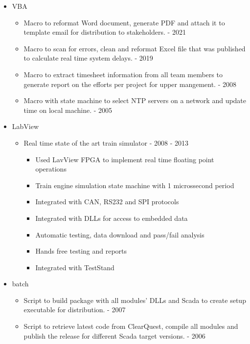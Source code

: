 {\begin{itemize}
    \item VBA
    \begin{itemize}
        \item Macro to reformat Word document, generate PDF and attach it to template email for distribution to stakeholders. - 2021
        \item Macro to scan for errors, clean and reformat Excel file that was published to calculate real time system delays. - 2019
        \item Macro to extract timesheet information from all team members to generate report on the efforts per project for upper mangement. - 2008
        \item Macro with state machine to select NTP servers on a network and update time on local machine. - 2005
    \end{itemize}

    \item LabView
    \begin{itemize}
        \item Real time state of the art train simulator - 2008 - 2013
        \begin{itemize}
            \item Used LavView FPGA to implement real time floating point operations
            \item Train engine simulation state machine with 1 microssecond period
            \item Integrated with CAN, RS232 and SPI protocols
            \item Integrated with DLLs for access to embedded data
            \item Automatic testing, data download and pass/fail analysis
            \item Hands free testing and reports
            \item Integrated with TestStand
        \end{itemize}
    \end{itemize}

    \item batch
    \begin{itemize}
        \item Script to build package with all modules' DLLs and Scada to create setup executable for distribution. - 2007
        \item Script to retrieve latest code from ClearQuest, compile all modules and publish the release for different Scada target versions. - 2006
    \end{itemize}


\end{itemize}}
